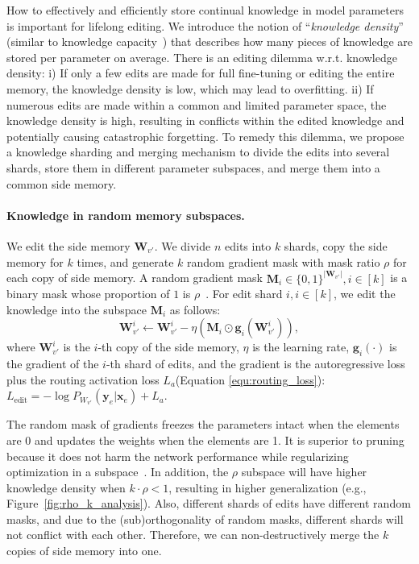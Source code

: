 How to effectively and efficiently store continual knowledge in model parameters is important for lifelong editing.
We introduce the notion of ``\textit{knowledge density}'' (similar to knowledge capacity~\cite{knowledge_capacity}) that describes how many pieces of knowledge are stored per parameter on average. There is an editing dilemma w.r.t. knowledge density: 
i) If only a few edits are made for full fine-tuning or editing the entire memory, the knowledge density is low, which may lead to overfitting.
ii) If numerous edits are made within a common and limited parameter space, the knowledge density is high, resulting in conflicts within the edited knowledge and potentially causing catastrophic forgetting.
To remedy this dilemma, we propose a knowledge sharding and merging mechanism to divide the edits into several shards, store them in different parameter subspaces, and merge them into a common side memory. 

\paragraph{Knowledge in random memory subspaces.} 
We edit the side memory $\mathbf{W}_{v'}$. 
We divide $n$ edits into $k$ shards, copy the side memory for $k$ times, and generate $k$ random gradient mask with mask ratio $\rho$ for each copy of side memory.
A random gradient mask $\mathbf{M}_i \in \{0, 1\}^{|\mathbf{W}_{v'}|}, i \in [k]$ is a binary mask whose proportion of $1$ is $\rho$~\cite{tna}. For edit shard $i, i \in [k]$, we edit the knowledge into the subspace $\mathbf{M}_i$ as follows:
\begin{equation} \label{equ:subspace_update}
    \mathbf{W}_{v'}^{i} \leftarrow \mathbf{W}_{v'}^{i}-\eta(\mathbf{M}_i\odot\mathbf{g}_i(\mathbf{W}_{v'}^{i})),
\end{equation}
where $\mathbf{W}_{v'}^{i}$ is the $i$-th copy of the side memory, $\eta$ is the learning rate, $\mathbf{g}_i(\cdot)$ is the gradient of the $i$-th shard of edits, and the gradient is the autoregressive loss plus the routing activation loss $L_a$(Equation \ref{equ:routing_loss}): $L_{\text{edit}} = -\log P_{W_{v'}}(\mathbf{y}_e | \mathbf{x}_e) + L_a$.

The random mask of gradients freezes the parameters intact when the elements are 0 and updates the weights when the elements are 1. 
It is superior to pruning because it does not harm the network performance while regularizing optimization in a subspace~\cite{tna}.
In addition, the $\rho$ subspace will have higher knowledge density when $k\cdot\rho < 1$, resulting in higher generalization (e.g., Figure~\ref{fig:rho_k_analysis}). Also, different shards of edits have different random masks, and due to the (sub)orthogonality of random masks, different shards will not conflict with each other. Therefore, we can non-destructively merge the $k$ copies of side memory into one.

